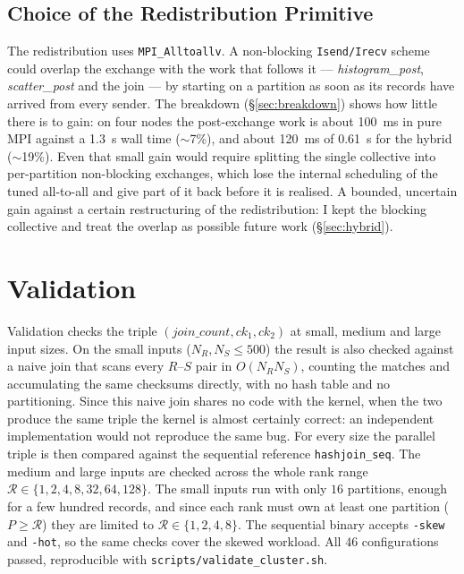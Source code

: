 \documentclass[10pt,twocolumn,a4paper]{article}
\begin{document}
\subsection{Choice of the Redistribution Primitive}
The redistribution uses \texttt{MPI\_Alltoallv}. A non-blocking
\texttt{Isend/Irecv} scheme could overlap the exchange with the work that
follows it --- \emph{histogram\_post}, \emph{scatter\_post} and the join ---
by starting on a partition as soon as its records have arrived from every
sender. The breakdown (\S\ref{sec:breakdown}) shows how little there is
to gain: on four nodes the post-exchange work is about \SI{100}{ms} in
pure MPI against a \SI{1.3}{s} wall time ($\sim$7\%), and about
\SI{120}{ms} of \SI{0.61}{s} for the hybrid ($\sim$19\%). Even that
small gain would require splitting the single collective into
per-partition non-blocking exchanges, which lose the internal scheduling
of the tuned all-to-all and give part of it back before it is realised. A bounded, uncertain gain
against a certain restructuring of the redistribution: I kept the blocking
collective and treat the overlap as possible future work (\S\ref{sec:hybrid}).


\section{Validation}
Validation checks the triple
$(\textit{join\_count},\textit{ck}_1,\textit{ck}_2)$ at small,
medium and large input sizes. On the small inputs
($N_R, N_S\le 500$) the result is also checked against a naive join
that scans every $R$--$S$ pair in $O(N_R N_S)$, counting the
matches and accumulating the same checksums directly, with no hash
table and no partitioning. Since this naive join shares no code with the
kernel, when the two produce the same triple the kernel is almost
certainly correct: an independent implementation would not reproduce the
same bug. For every size the
parallel triple is then compared against the sequential reference
\texttt{hashjoin\_seq}. The medium and large inputs are checked
across the whole rank range $\mathcal{R}\in\{1,2,4,8,32,64,128\}$.
The small inputs run with only $16$ partitions, enough for a few
hundred records, and since each rank must own at least one
partition ($P\ge\mathcal{R}$) they are limited to
$\mathcal{R}\in\{1,2,4,8\}$. The sequential binary accepts \texttt{-skew} and
\texttt{-hot}, so the same checks cover the skewed workload. All
$46$ configurations passed, reproducible with
\texttt{scripts/validate\_cluster.sh}.
\end{document}
